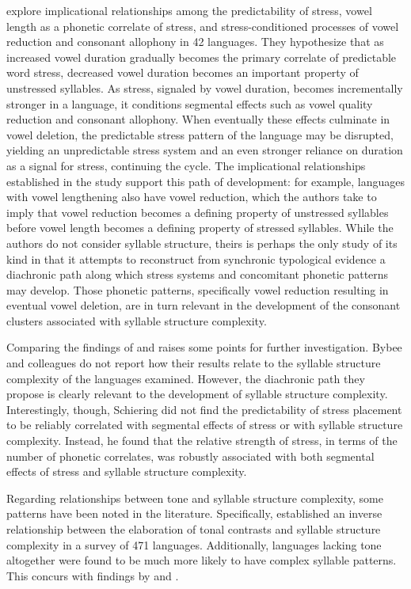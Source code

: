   \citet{BybeeEtAl1998} explore implicational relationships among the predictability of stress, vowel length as a phonetic correlate of stress, and stress-conditioned processes of vowel reduction and consonant allophony in 42 languages. They hypothesize that as increased vowel duration gradually becomes the primary correlate of predictable word stress, decreased vowel duration becomes an important property of unstressed syllables. As stress, signaled by vowel duration, becomes incrementally stronger in a language, it conditions segmental effects such as vowel quality reduction and consonant allophony. When eventually these effects culminate in vowel deletion, the predictable stress pattern of the language may be disrupted, yielding an unpredictable stress system and an even stronger reliance on duration as a signal for stress, continuing the cycle. The implicational relationships established in the study support this path of development: for example, languages with vowel lengthening also have vowel reduction, which the authors take to imply that vowel reduction becomes a defining property of unstressed syllables before vowel length becomes a defining property of stressed syllables. While the authors do not consider syllable structure, theirs is perhaps the only study of its kind in that it attempts to reconstruct from synchronic typological evidence a diachronic path along which stress systems and concomitant phonetic patterns may develop. Those phonetic patterns, specifically vowel reduction resulting in eventual vowel deletion, are in turn relevant in the development of the consonant clusters associated with syllable structure complexity.

  Comparing the findings of \citet{BybeeEtAl1998} and \citet{Schiering2007} raises some points for further investigation. Bybee and colleagues do not report how their results relate to the syllable structure complexity of the languages examined. However, the diachronic path they propose is clearly relevant to the development of syllable structure complexity. Interestingly, though, Schiering did not find the predictability of stress placement to be reliably correlated with segmental effects of stress or with syllable structure complexity. Instead, he found that the relative strength of stress, in terms of the number of phonetic correlates, was robustly associated with both segmental effects of stress and syllable structure complexity.

  Regarding relationships between tone and syllable structure complexity, some patterns have been noted in the literature. Specifically, \citet{Maddieson2013d} established an inverse relationship between the elaboration of tonal contrasts and syllable structure complexity in a survey of 471 languages. Additionally, languages lacking tone altogether were found to be much more likely to have complex syllable patterns. This concurs with findings by \citet{Auer1993} and \citet{Schiering2007}.

